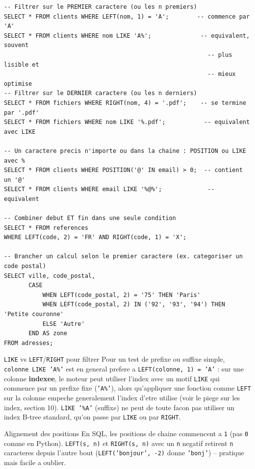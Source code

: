 \documentclass[11pt,a4paper]{article}
\begin{document}
\begin{lstlisting}
-- Filtrer sur le PREMIER caractere (ou les n premiers)
SELECT * FROM clients WHERE LEFT(nom, 1) = 'A';        -- commence par 'A'
SELECT * FROM clients WHERE nom LIKE 'A%';              -- equivalent, souvent
                                                          -- plus lisible et
                                                          -- mieux optimise
-- Filtrer sur le DERNIER caractere (ou les n derniers)
SELECT * FROM fichiers WHERE RIGHT(nom, 4) = '.pdf';    -- se termine par '.pdf'
SELECT * FROM fichiers WHERE nom LIKE '%.pdf';           -- equivalent avec LIKE

-- Un caractere precis n'importe ou dans la chaine : POSITION ou LIKE avec %
SELECT * FROM clients WHERE POSITION('@' IN email) > 0;  -- contient un '@'
SELECT * FROM clients WHERE email LIKE '%@%';             -- equivalent

-- Combiner debut ET fin dans une seule condition
SELECT * FROM references
WHERE LEFT(code, 2) = 'FR' AND RIGHT(code, 1) = 'X';

-- Brancher un calcul selon le premier caractere (ex. categoriser un code postal)
SELECT ville, code_postal,
       CASE
           WHEN LEFT(code_postal, 2) = '75' THEN 'Paris'
           WHEN LEFT(code_postal, 2) IN ('92', '93', '94') THEN 'Petite couronne'
           ELSE 'Autre'
       END AS zone
FROM adresses;
\end{lstlisting}

\begin{infobox}{\texttt{LIKE} vs \texttt{LEFT}/\texttt{RIGHT} pour filtrer}
Pour un test de prefixe ou suffixe simple, \texttt{colonne LIKE 'A\%'} est en
general prefere a \texttt{LEFT(colonne, 1) = 'A'} : sur une colonne
\textbf{indexee}, le moteur peut utiliser l'index avec un motif \texttt{LIKE}
qui commence par un prefixe fixe (\texttt{'A\%'}), alors qu'appliquer une
fonction comme \texttt{LEFT} sur la colonne empeche generalement l'index
d'etre utilise (voir le piege sur les index, section 10). \texttt{LIKE
'\%A'} (suffixe) ne peut de toute facon pas utiliser un index B-tree standard,
qu'on passe par \texttt{LIKE} ou par \texttt{RIGHT}.
\end{infobox}

\begin{infobox}{Alignement des positions}
En SQL, les positions de chaine commencent a \texttt{1} (pas \texttt{0} comme
en Python). \texttt{LEFT(s, n)} et \texttt{RIGHT(s, n)} avec un \texttt{n}
negatif retirent \texttt{n} caracteres depuis l'autre bout
(\texttt{LEFT('bonjour', -2)} donne \texttt{'bonj'}) -- pratique mais facile a
oublier.
\end{infobox}
\end{document}
